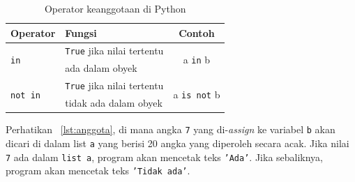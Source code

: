 \begin{table}
\caption{Operator keanggotaan di Python}
\label{tab:anggota}
  \begin{center}
    \begin{tabular}{@{}llc@{}}\toprule
    Operator & Fungsi  & Contoh\\ \midrule
    \multirow{2}{*}{\texttt{in}} & \texttt{True} jika nilai tertentu  & \multirow{2}{*}{a \texttt{in} b} \\
    & ada dalam obyek & \\
    \multirow{2}{*}{\texttt{not in}} & \texttt{True} jika nilai tertentu & \multirow{2}{*}{a \texttt{is not} b} \\
    & tidak ada dalam obyek &\\
       \bottomrule
    \end{tabular}
  \end{center}
\end{table}

Perhatikan \lstlistingname~\ref{lst:anggota}, di mana angka \texttt{7} yang di-\textit{assign} ke variabel \texttt{b} akan dicari di dalam list \texttt{a} yang berisi 20 angka yang diperoleh secara acak. Jika nilai \texttt{7} ada dalam \texttt{list a}, program akan mencetak teks \texttt{'Ada'}. Jika sebaliknya, program akan mencetak teks \texttt{'Tidak ada'}.



